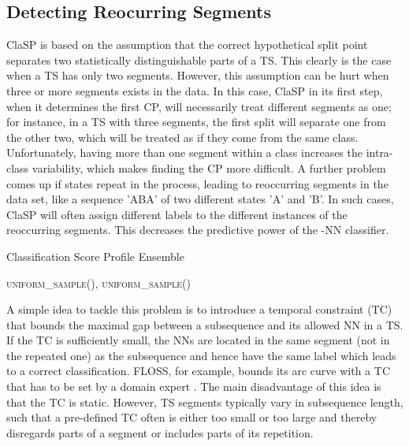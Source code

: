 \documentclass[pdflatex,sn-basic]{sn-jnl}
\begin{document}
\subsection{Detecting Reocurring Segments} \label{sec:ensembling}

ClaSP is based on the assumption that the correct hypothetical split point separates two statistically distinguishable parts of a TS. This clearly is the case when a TS has only two segments. However, this assumption can be hurt when three or more segments exists in the data. In this case, ClaSP in its first step, when it determines the first CP, will necessarily treat different segments as one; for instance, in a TS with three segments, the first split will separate one from the other two, which will be treated as if they come from the same class. Unfortunately, having more than one segment within a class increases the intra-class variability, which makes finding the CP more difficult. A further problem comes up if states repeat in the process, leading to reoccurring segments in the data set, like a sequence 'ABA' of two different states 'A' and 'B'. In such cases, ClaSP will often assign different labels to the different instances of the reoccurring segments. This decreases the predictive power of the -NN classifier. 

\begin{algorithm}[t]
	\caption{Classification Score Profile Ensemble}\label{alg:clasp_ensemble}
	\begin{algorithmic}[1]
			\State 

			\For{}
                \State  \textsc{uniform\_sample}(), \textsc{uniform\_sample}()
			    \State 
			    \State 
			    \State 
			    
			\EndFor 
			\State \Return{}
		\EndProcedure
	\end{algorithmic}
\end{algorithm}

A simple idea to tackle this problem is to introduce a temporal constraint (TC) that bounds the maximal gap between a subsequence and its allowed NN in a TS. If the TC is sufficiently small, the NNs are located in the same segment (not in the repeated one) as the subsequence and hence have the same label which leads to a correct classification. FLOSS, for example, bounds its arc curve with a TC that has to be set by a domain expert \citep{gharghabi2017matrix}. The main disadvantage of this idea is that the TC is static. However, TS segments typically vary in subsequence length, such that a pre-defined TC often is either too small or too large and thereby disregards parts of a segment or includes parts of its repetition.
\end{document}
